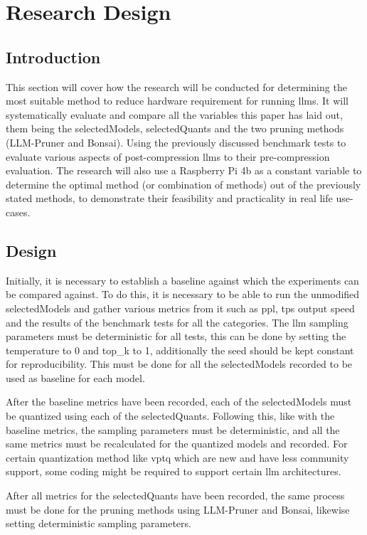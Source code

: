 \documentclass{ifacconf}
\begin{document}
	
	\section{Research Design}
	\subsection{Introduction}
	This section will cover how the research will be conducted for determining the most suitable method to reduce hardware requirement for running \glspl{llm}. It will systematically evaluate and compare all the variables this paper has laid out, them being the \gls{selectedModels}, \gls{selectedQuants} and the two pruning methods (LLM-Pruner and Bonsai). Using the previously discussed benchmark tests to evaluate various aspects of post-compression \glspl{llm} to their pre-compression evaluation. The research will also use a Raspberry Pi 4b as a constant variable to determine the optimal method (or combination of methods) out of the previously stated methods, to demonstrate their feasibility and practicality in real life use-cases.
	
	\subsection{Design}
	Initially, it is necessary to establish a baseline against which the experiments can be compared against. To do this, it is necessary to be able to run the unmodified \gls{selectedModels} and gather various metrics from it such as \gls{ppl}, \gls{tps} output speed and the results of the benchmark tests for all the categories. The \gls{llm} sampling parameters must be deterministic for all tests, this can be done by setting the temperature to 0 and top\_k to 1, additionally the seed should be kept constant for reproducibility. This must be done for all the \gls{selectedModels} recorded to be used as baseline for each model.
	
	After the baseline metrics have been recorded, each of the \gls{selectedModels} must be quantized using each of the \gls{selectedQuants}. Following this, like with the baseline metrics, the sampling parameters must be deterministic, and all the same metrics must be recalculated for the quantized models and recorded. For certain quantization method like \gls{vptq} which are new and have less community support, some coding might be required to support certain \gls{llm} architectures.
	
	After all metrics for the \gls{selectedQuants} have been recorded, the same process must be done for the pruning methods using LLM-Pruner and Bonsai, likewise setting deterministic sampling parameters.
	
\end{document}
